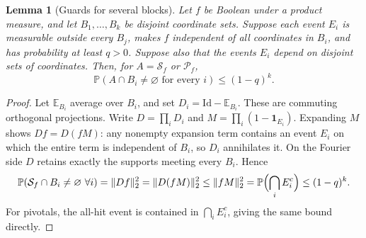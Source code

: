 \documentclass[11pt]{amsart}
\newtheorem{lemma}[theorem]{Lemma}
\theoremstyle{remark}
\newcommand{\Prob}{\mathbb P}
\newcommand{\E}{\mathbb E}
\newcommand{\one}{\mathbf 1}
\newcommand{\cS}{\mathcal S}
\newcommand{\cP}{\mathcal P}
\begin{document}
\begin{lemma}[Guards for several blocks]\label{lem:blockguards}
Let $f$ be Boolean under a product measure, and let $B_1,\ldots,B_k$ be disjoint coordinate sets. Suppose each event $E_i$ is measurable outside every $B_j$, makes $f$ independent of all coordinates in $B_i$, and has probability at least $q>0$. Suppose also that the events $E_i$ depend on disjoint sets of coordinates. Then, for $A=\cS_f$ or $\cP_f$,
\begin{equation}\label{eq:allhit}
 \Prob(A\cap B_i\ne\varnothing\text{ for every }i)\le(1-q)^k.
\end{equation}
\end{lemma}
\begin{proof}
Let $\E_{B_i}$ average over $B_i$, and set $D_i=\mathrm{Id}-\E_{B_i}$. These are commuting orthogonal projections. Write $D=\prod_iD_i$ and $M=\prod_i(1-\one_{E_i})$. Expanding $M$ shows $Df=D(fM)$: any nonempty expansion term contains an event $E_i$ on which the entire term is independent of $B_i$, so $D_i$ annihilates it. On the Fourier side $D$ retains exactly the supports meeting every $B_i$. Hence
\[
 \Prob(\cS_f\cap B_i\ne\varnothing\ \forall i)
 =\|Df\|_2^2=\|D(fM)\|_2^2
 \le\|fM\|_2^2
 =\Prob\Bigl(\bigcap_iE_i^c\Bigr)\le(1-q)^k.
\]
For pivotals, the all-hit event is contained in $\bigcap_iE_i^c$, giving the same bound directly.
\end{proof}
\end{document}
